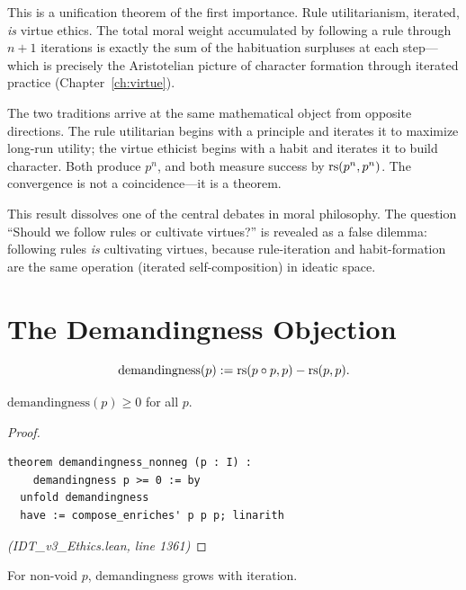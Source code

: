 \begin{interpretation}
This is a unification theorem of the first importance. Rule utilitarianism,
iterated, \emph{is} virtue ethics. The total moral weight accumulated by
following a rule through $n+1$ iterations is exactly the sum of the
habituation surpluses at each step---which is precisely the Aristotelian
picture of character formation through iterated practice
(Chapter~\ref{ch:virtue}).

The two traditions arrive at the same mathematical object from opposite
directions. The rule utilitarian begins with a principle and iterates it
to maximize long-run utility; the virtue ethicist begins with a habit
and iterates it to build character. Both produce $p^n$, and both measure
success by $\mathrm{rs}(p^n, p^n)$. The convergence is not a coincidence---it
is a theorem.

This result dissolves one of the central debates in moral philosophy.
The question ``Should we follow rules or cultivate virtues?'' is revealed
as a false dilemma: following rules \emph{is} cultivating virtues, because
rule-iteration and habit-formation are the same operation (iterated
self-composition) in ideatic space.
\end{interpretation}

\section{The Demandingness Objection}

\begin{definition}[Demandingness]
\label{def:demandingness}
\[
  \mathrm{demandingness}(p) := \mathrm{rs}(p \circ p, p) - \mathrm{rs}(p, p).
\]
\end{definition}

\begin{theorem}
\label{thm:demandingness-nonneg}
$\mathrm{demandingness}(p) \geq 0$ for all $p$.
\end{theorem}

\begin{proof}
\begin{lstlisting}
theorem demandingness_nonneg (p : I) :
    demandingness p >= 0 := by
  unfold demandingness
  have := compose_enriches' p p p; linarith
\end{lstlisting}
\textit{(IDT\_v3\_Ethics.lean, line 1361)}
\end{proof}

\begin{theorem}
\label{thm:demandingness-accumulates}
For non-void $p$, demandingness grows with iteration.
\end{theorem}

